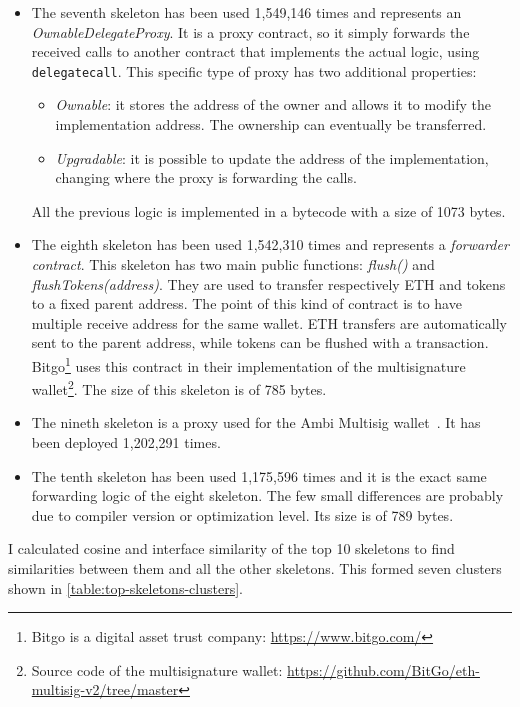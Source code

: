 \begin{itemize}
    \item The seventh skeleton has been used 1,549,146 times and represents an \textit{OwnableDelegateProxy}. It is a proxy contract, so it simply forwards the received calls to another contract that implements the actual logic, using {\tt delegatecall}. This specific type of proxy has two additional properties:
    \begin{itemize}
        \item \textit{Ownable}: it stores the address of the owner and allows it to modify the implementation address. The ownership can eventually be transferred.
        \item \textit{Upgradable}: it is possible to update the address of the implementation, changing where the proxy is forwarding the calls.
    \end{itemize}
    All the previous logic is implemented in a bytecode with a size of 1073 bytes.

    \item The eighth skeleton has been used 1,542,310 times and represents a \textit{forwarder contract}. This skeleton has two main public functions: \textit{flush()} and \textit{flushTokens(address)}. They are used to transfer respectively ETH and tokens to a fixed parent address. The point of this kind of contract is to have multiple receive address for the same wallet. ETH transfers are automatically sent to the parent address, while tokens can be flushed with a transaction. Bitgo\footnote{Bitgo is a digital asset trust company: \url{https://www.bitgo.com/}} uses this contract in their implementation of the multisignature wallet\footnote{Source code of the multisignature wallet: \url{https://github.com/BitGo/eth-multisig-v2/tree/master}}. The size of this skeleton is of 785 bytes.

    \item The nineth skeleton is a proxy used for the Ambi Multisig wallet~\cite{wallet-contracts}. It has been deployed 1,202,291 times. 

    \item The tenth skeleton has been used 1,175,596 times and it is the exact same forwarding logic of the eight skeleton. The few small differences are probably due to compiler version or optimization level. Its size is of 789 bytes.
    
\end{itemize}

I calculated cosine and interface similarity of the top 10 skeletons to find similarities between them and all the other skeletons. This formed seven clusters shown in \cref{table:top-skeletons-clusters}.

